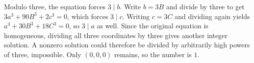 Modulo three, the equation forces $3\mid b$. Write $b=3B$ and divide by three to get $3a^3+90B^3+2c^3=0$, which forces $3\mid c$. Writing $c=3C$ and dividing again yields $a^3+30B^3+18C^3=0$, so $3\mid a$ as well. Since the original equation is homogeneous, dividing all three coordinates by three gives another integer solution. A nonzero solution could therefore be divided by arbitrarily high powers of three, impossible. Only $(0,0,0)$ remains, so the number is $\boxed1$.
